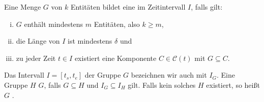 \begin{definition}[{name=[Gruppe während eines Zeitraums]},label=def:gruppe]
	Eine Menge $G$ von $k$ Entitäten bildet eine  im Zeitintervall $I$, falls gilt:
	\begin{enumerate}[(i)]
		\item $G$ enthält mindestens $m$ Entitäten, also $k \ge m$,
		\item die Länge von $I$ ist mindestens $\delta$ und
		\item\label{enum:3:def:gruppe}zu jeder Zeit $t \in I$ existiert eine Komponente $C \in \mathcal{C}(t)$ mit $G \subseteq C$.
	\end{enumerate}
	Das Intervall $I=[t_s,t_e]$ der Gruppe $G$ bezeichnen wir auch mit $I_G$.
	Eine Gruppe $H$  $G$, falls $G \subseteq H$ und $I_G \subseteq I_H$ gilt.
	Falls kein solches $H$ existiert, so heißt $G$ .
\end{definition}

